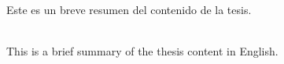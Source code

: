 \label{cap:resumen}
\mbox{}\\
Este es un breve resumen del contenido de la tesis.

\label{cap:abstract}
\mbox{}\\
This is a brief summary of the thesis content in English.